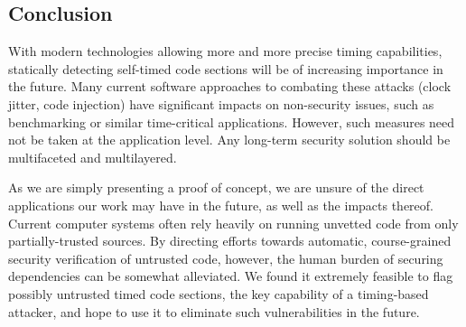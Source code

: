 \documentclass[12pt]{article}
\begin{document}
\begin{multicols*}{2}
  \section{Conclusion}

  With modern technologies allowing more and more precise timing capabilities,
  statically detecting self-timed code sections will be of increasing
  importance in the future. Many current software approaches to combating
  these attacks (clock jitter, code injection) have significant impacts on
  non-security issues, such as benchmarking or similar time-critical
  applications. However, such measures need not be taken at the application
  level. Any long-term security solution should be multifaceted and
  multilayered.

  As we are simply presenting a proof of concept, we are unsure of the direct
  applications our work may have in the future, as well as the impacts thereof.
  Current computer systems often rely heavily on running unvetted code from
  only partially-trusted sources. By directing efforts towards automatic,
  course-grained security verification of untrusted code, however, the human
  burden of securing dependencies can be somewhat alleviated. We found it
  extremely feasible to flag possibly untrusted timed code sections, the key
  capability of a timing-based attacker, and hope to use it to eliminate
  such vulnerabilities in the future.
\end{multicols*}



\end{document}
